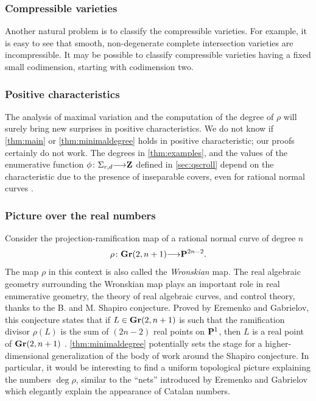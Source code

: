 \documentclass[11pt,reqno]{amsart}
\theoremstyle{plain}
\theoremstyle{definition}
\theoremstyle{remark}
\numberwithin{equation}{section}
\renewcommand{\to}{{\longrightarrow}}
\numberwithin{equation}{section}
\begin{document}
\subsubsection{Compressible varieties}  Another natural problem is to classify the compressible varieties.
For example, it is easy to see that smooth, non-degenerate complete intersection varieties are incompressible.
It may be possible to classify compressible varieties having a fixed small codimension, starting with codimension two.

\subsubsection{Positive characteristics}
The analysis of maximal variation and the computation of the degree of $\rho$  will surely bring new surprises in positive characteristics.
We do not know if \autoref{thm:main} or \autoref{thm:minimaldegree} holds in positive characteristic; our proofs certainly do not work.
The degrees in \autoref{thm:examples}, and the values of the enumerative function $\phi \from \Sigma_{r,d} \to \Z$ defined in \autoref{sec:qscroll} depend on the characteristic due to the presence of inseparable covers, even for rational normal curves \cite{oss:06}.


\subsubsection{Picture over the real numbers}
Consider the projection-ramification map of a rational normal curve of degree $n$
\[ \rho \from \Gr(2, n+1) \to \P^{2n-2}.\]
The map $\rho$ in this context is also called the \emph{Wronskian} map.
The real algebraic geometry surrounding the Wronskian map plays an important role in real enumerative geometry, the theory of real algebraic curves, and control theory, thanks to the B. and M. Shapiro conjecture.
Proved by Eremenko and Gabrielov, this conjecture states that if $L \in \Gr(2, n+1)$ is such that the ramification divisor $\rho(L)$ is the sum of $(2n-2)$ real points on $\P^1$, then $L$ is a real point of $\Gr(2, n+1)$ \cite{sot:00, ere.gab:02}.
\autoref{thm:minimaldegree} potentially sets the stage for a higher-dimensional generalization of the body of work around the Shapiro conjecture.
In particular, it would be interesting to find a uniform topological picture explaining the numbers $\deg \rho$, similar to the ``nets'' introduced by Eremenko and Gabrielov which elegantly explain the appearance of Catalan numbers.
\end{document}
